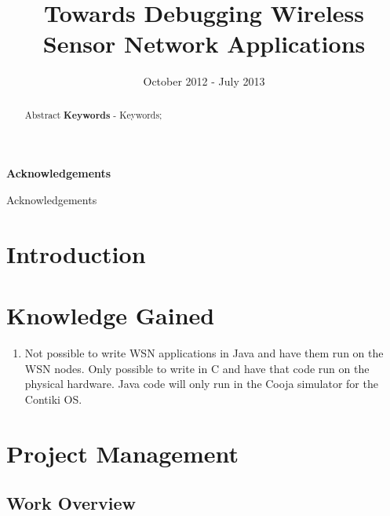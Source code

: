 \documentclass[a4paper]{article}
\title{Towards Debugging Wireless Sensor Network Applications}
\date{October 2012 - July 2013}
\author{}
\makeatletter
\newcommand\ackname{Acknowledgements}
\newenvironment{acknowledgements}{%
      \titlepage
      \null\vfil
      \@beginparpenalty\@lowpenalty
      \begin{center}%
        \bfseries \ackname
        \@endparpenalty\@M
      \end{center}}%
     {\par\vfil\null\endtitlepage}
\newenvironment{acknowledgements}{%
      \if@twocolumn
        \section*{\abstractname}%
      \else
        \small
        \begin{center}%
          {\bfseries \ackname\vspace{-.5em}\vspace{\z@}}%
        \end{center}%
        \quotation
      \fi}
      {\if@twocolumn\else\endquotation\fi}
\makeatother
\begin{document}
\maketitle

\pagestyle{empty}
\thispagestyle{empty}

\newpage

\begin{abstract}
Abstract
\newline
\newline
\noindent \textbf{Keywords} - Keywords;
\end{abstract}
\newpage

\begin{acknowledgements}
Acknowledgements
\end{acknowledgements}
\newpage


\pagestyle{plain}
\setcounter{page}{1}

\tableofcontents
\clearpage


\section{Introduction}

\clearpage


\section{Knowledge Gained}
\begin{enumerate}
	\item Not possible to write WSN applications in Java and have them run on the WSN nodes. Only possible to write in C and have that code run on the physical hardware. Java code will only run in the Cooja simulator for the Contiki OS.
\end{enumerate}
\clearpage


\section{Project Management}

\subsection{Work Overview}
\end{document}
